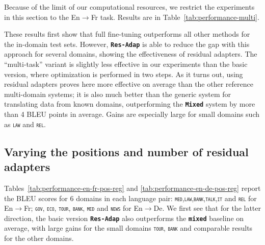 \documentclass[11pt,a4paper]{article}
\newcommand{\fyFuture}[1]{\done[FY]\Todo[FY:]{\textcolor{red}{#1}}}
\newcommand{\domain}[1]{\texttt{\textsc{#1}}}
\newcommand{\system}[1]{\texttt{\textbf{#1}}}
\begin{document}
Because of the limit of our computational resources, we restrict the experiments in this section to the En$\rightarrow$Fr task. Results are in Table~\ref{tab:performance-multi}.\fyFuture{Perform experiments for de:en}\fyFuture{Restore results where residual are removed from other paper.}

These results first show that full fine-tuning outperforms all other methods for the in-domain test sets. However, \system{Res-Adap} is able to reduce the gap with this approach for several domains, showing the effectiveness of residual adapters. The ``multi-task'' variant is slightly less effective in our experiments than the basic version, where optimization is performed in two steps. As it turns out, using residual adapters proves here more effective on average than the other reference multi-domain systems; it is also much better than the generic system for translating data from known domains, outperforming the \system{Mixed} system by more than 4 BLEU points in average. Gains are especially large for small domains such as \domain{law} and \domain{rel}.


\subsection{Varying the positions and number of residual adapters}
Tables~\ref{tab:performance-en-fr-pos-reg} and \ref{tab:performance-en-de-pos-reg} report the BLEU scores for 6 domains in each language pair: \domain{med},\domain{law},\domain{bank},\domain{talk},\domain{it} and \domain{rel} for En$\rightarrow$Fr; \domain{gov}, \domain{eco}, \domain{tour}, \domain{bank}, \domain{med} and \domain{news} for En$\rightarrow$De. We first see that for the latter direction, the basic version \system{Res-Adap} also outperforms the \system{mixed} baseline on average, with large gains for the small domains \domain{tour}, \domain{bank} and comparable results for the other domains.
\fyFuture{Full FT for en->DE ? }
\end{document}
